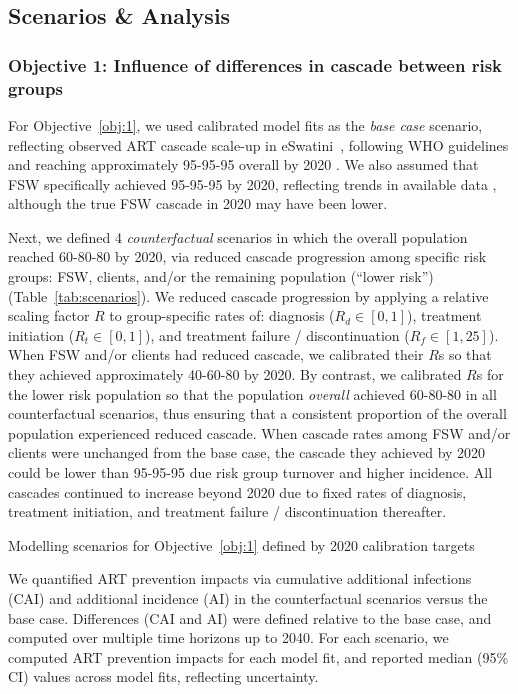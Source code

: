 \subsection{Scenarios \& Analysis}\label{meth.ana}
\subsubsection{Objective 1: Influence of differences in cascade between risk groups}\label{meth.obj.1}
For Objective~\ref{obj:1},
we used calibrated model fits as the \emph{base case} scenario, reflecting
observed ART cascade scale-up in eSwatini~\cite{SDHS2006,SHIMS1,SHIMS2},
following WHO guidelines and reaching approximately 95-95-95 overall by 2020 \cite{AIDSinfo}.
We also assumed that FSW specifically achieved \mbox{95-95-95} by 2020, reflecting
trends in available data \cite{Baral2014,EswKP2014},
although the true FSW cascade in 2020 may have been lower.
\par
Next, we defined 4 \emph{counterfactual} scenarios in which
the overall population reached 60-80-80 by 2020, %
via reduced cascade progression among specific risk groups:
FSW, clients, and/or the remaining population (``lower risk'') (Table~\ref{tab:scenarios}).
We reduced cascade progression by applying a relative scaling factor $R$ to group-specific rates of:
diagnosis ($R_d\in[0,1]$), treatment initiation ($R_t\in[0,1]$),
and treatment failure / discontinuation ($R_f\in[1,25]$).
When FSW and/or clients had reduced cascade, we calibrated their $R$s so that
they achieved approximately 40-60-80 by 2020. %
By contrast, we calibrated $R$s for the lower risk population so that
the population \emph{overall} achieved 60-80-80 in all counterfactual scenarios,
thus ensuring that a consistent proportion of the overall population experienced reduced cascade.
When cascade rates among FSW and/or clients were unchanged from the base case,
the cascade they achieved by 2020 could be lower than 95-95-95
due risk group turnover and higher incidence.
All cascades continued to increase beyond 2020 due to
fixed rates of diagnosis, treatment initiation, and treatment failure / discontinuation thereafter.
\begin{table}[b]
  \centering
  \caption{Modelling scenarios for Objective~\ref{obj:1} defined by 2020 calibration targets}
  \label{tab:scenarios}
  
\end{table}
\par
We quantified ART prevention impacts via
cumulative additional infections (CAI) and additional incidence (AI)
in the counterfactual scenarios versus the base case.
Differences (CAI and AI) were defined relative to the base case,
and computed over multiple time horizons up to 2040.
For each scenario, we computed ART prevention impacts for each model fit,
and reported median (95\% CI) values across model fits, reflecting uncertainty.
